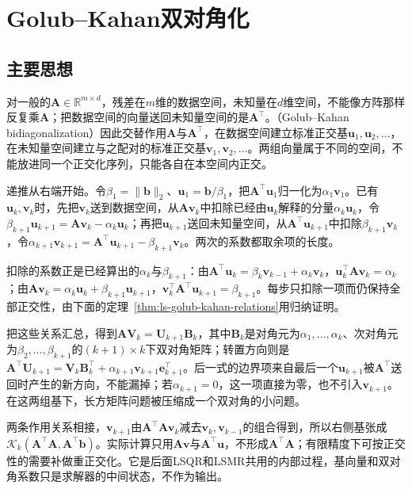 \section{Golub--Kahan双对角化}
\label{sec:ls-bidiagonal-iteration}

\subsection{主要思想}

对一般的$\bm A\in\mathbb R^{m\times d}$，残差在$m$维的数据空间，未知量在$d$维空间，不能像方阵那样反复乘$\bm A$；把数据空间的向量送回未知量空间的是$\bm A^\top$。（Golub--Kahan bidiagonalization）因此交替作用$\bm A$与$\bm A^\top$，在数据空间建立标准正交基$\bm u_1,\bm u_2,\ldots$，在未知量空间建立与之配对的标准正交基$\bm v_1,\bm v_2,\ldots$。两组向量属于不同的空间，不能放进同一个正交化序列，只能各自在本空间内正交。

递推从右端开始。令$\beta_1=\lVert\bm b\rVert_2$、$\bm u_1=\bm b/\beta_1$，把$\bm A^\top\bm u_1$归一化为$\alpha_1\bm v_1$。已有$\bm u_k,\bm v_k$时，先把$\bm v_k$送到数据空间，从$\bm A\bm v_k$中扣除已经由$\bm u_k$解释的分量$\alpha_k\bm u_k$，令$\beta_{k+1}\bm u_{k+1}=\bm A\bm v_k-\alpha_k\bm u_k$；再把$\bm u_{k+1}$送回未知量空间，从$\bm A^\top\bm u_{k+1}$中扣除$\beta_{k+1}\bm v_k$，令$\alpha_{k+1}\bm v_{k+1}=\bm A^\top\bm u_{k+1}-\beta_{k+1}\bm v_k$。两次的系数都取余项的长度。

扣除的系数正是已经算出的$\alpha_k$与$\beta_{k+1}$：由$\bm A^\top\bm u_k=\beta_k\bm v_{k-1}+\alpha_k\bm v_k$，$\bm u_k^\top\bm A\bm v_k=\alpha_k$；由$\bm A\bm v_k=\alpha_k\bm u_k+\beta_{k+1}\bm u_{k+1}$，$\bm v_k^\top\bm A^\top\bm u_{k+1}=\beta_{k+1}$。每步只扣除一项而仍保持全部正交性，由下面的定理~\ref{thm:ls-golub-kahan-relations}用归纳证明。

把这些关系汇总，得到$\bm A\bm V_k=\bm U_{k+1}\bm B_k$，其中$\bm B_k$是对角元为$\alpha_1,\ldots,\alpha_k$、次对角元为$\beta_2,\ldots,\beta_{k+1}$的$(k+1)\times k$下双对角矩阵；转置方向则是$\bm A^\top\bm U_{k+1}=\bm V_k\bm B_k^\top+\alpha_{k+1}\bm v_{k+1}\bm e_{k+1}^\top$。后一式的边界项来自最后一个$\bm u_{k+1}$被$\bm A^\top$送回时产生的新方向，不能漏掉；若$\alpha_{k+1}=0$，这一项直接为零，也不引入$\bm v_{k+1}$。在这两组基下，长方矩阵问题被压缩成一个双对角的小问题。

两条作用关系相接，$\bm v_{k+1}$由$\bm A^\top\bm A\bm v_k$减去$\bm v_k,\bm v_{k-1}$的组合得到，所以右侧基张成$\mathcal K_k(\bm A^\top\bm A,\bm A^\top\bm b)$。实际计算只用$\bm A\bm v$与$\bm A^\top\bm u$，不形成$\bm A^\top\bm A$；有限精度下可按正交性的需要补做重正交化。它是后面LSQR和LSMR共用的内部过程，基向量和双对角系数只是求解器的中间状态，不作为输出。


